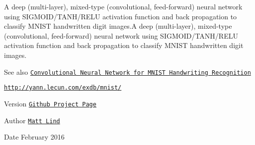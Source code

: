 A deep (multi-\/layer), mixed-\/type (convolutional, feed-\/forward) neural network using S\+I\+G\+M\+O\+I\+D/\+T\+A\+N\+H/\+R\+E\+L\+U activation function and back propagation to classify M\+N\+I\+S\+T handwritten digit images.\+A deep (multi-\/layer), mixed-\/type (convolutional, feed-\/forward) neural network using S\+I\+G\+M\+O\+I\+D/\+T\+A\+N\+H/\+R\+E\+L\+U activation function and back propagation to classify M\+N\+I\+S\+T handwritten digit images.

\begin{DoxySeeAlso}{See also}
\href{http://mmlind.github.io/Convolutional_Neural_Network_for_MNIST_Handwriting_Recognition/}{\tt Convolutional Neural Network for M\+N\+I\+S\+T Handwriting Recognition} 

\href{http://yann.lecun.com/exdb/mnist/}{\tt http\+://yann.\+lecun.\+com/exdb/mnist/} 
\end{DoxySeeAlso}
\begin{DoxyVersion}{Version}
\href{http://github.com/mmlind/mnist-cvnn/}{\tt Github Project Page} 
\end{DoxyVersion}
\begin{DoxyAuthor}{Author}
\href{http://mmlind.github.io}{\tt Matt Lind} 
\end{DoxyAuthor}
\begin{DoxyDate}{Date}
February 2016 
\end{DoxyDate}
